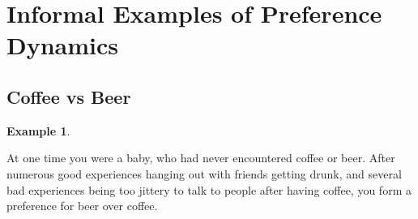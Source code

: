 \documentclass{article}
\theoremstyle{plain}
\theoremstyle{definition}
\newtheorem{example}{Example}[section]
\theoremstyle{remark}
\begin{document}
	\section{Informal Examples of Preference Dynamics}
%	


	\subsection{Coffee vs Beer}
	\begin{example} \label{ex:form}

		At one time you were a baby, who had never encountered coffee or beer. After numerous good experiences hanging out with friends getting drunk, and several bad experiences being too jittery to talk to people after having coffee, you form a preference for beer over coffee.
	\end{example}
	
\end{document}

